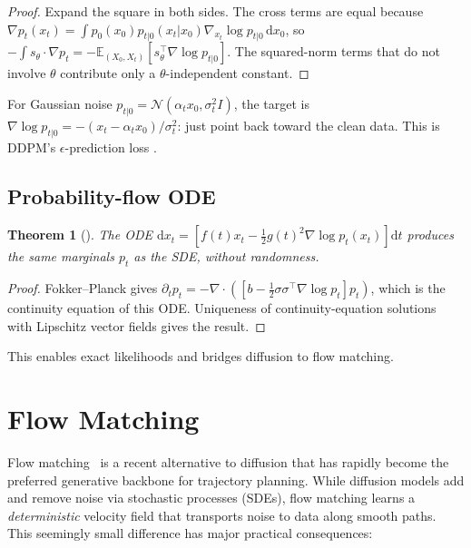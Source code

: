 \documentclass[11pt,letterpaper]{article}
\theoremstyle{plain}
\newtheorem{theorem}{Theorem}[section]
\theoremstyle{definition}
\theoremstyle{remark}
\newcommand{\E}{\mathbb{E}}
\newcommand{\dd}{\mathrm{d}}
\newcommand{\calN}{\mathcal{N}}
\newcommand{\grad}{\nabla}
\newcommand{\divg}{\nabla\cdot}
\begin{document}
\begin{advancedmath}
\begin{proof}
Expand the square in both sides. The cross terms are equal because
$\grad p_t(x_t)=\int p_0(x_0)p_{t|0}(x_t|x_0)\grad_{x_t}\log p_{t|0}\,\dd x_0$,
so $-\int s_\theta\cdot\grad p_t=-\E_{(X_0,X_t)}[s_\theta^\top\grad\log p_{t|0}]$.
The squared-norm terms that do not involve $\theta$ contribute only a
$\theta$-independent constant.
\end{proof}

For Gaussian noise $p_{t|0}=\calN(\alpha_tx_0,\sigma_t^2I)$, the target
is $\grad\log p_{t|0}=-(x_t-\alpha_tx_0)/\sigma_t^2$: just point back
toward the clean data. This is DDPM's $\epsilon$-prediction loss
\citep{ho2020ddpm}.

\subsection{Probability-flow ODE}

\begin{theorem}[\citet{song2021score}]
The ODE $\dd x_t=[f(t)x_t-\frac{1}{2}g(t)^2\grad\log p_t(x_t)]\dd t$
produces the same marginals $p_t$ as the SDE, without randomness.
\end{theorem}

\begin{proof}
Fokker--Planck gives
$\partial_tp_t=-\divg([b-\tfrac12\sigma\sigma^\top\grad\log p_t]p_t)$,
which is the continuity equation of this ODE. Uniqueness of
continuity-equation solutions with Lipschitz vector fields gives the
result.
\end{proof}

This enables exact likelihoods and bridges diffusion to flow matching.
\end{advancedmath}

\section{Flow Matching}\label{sec:fm}

Flow matching~\citep{lipman2023flow} is a recent alternative to
diffusion that has rapidly become the preferred generative backbone
for trajectory planning.  While diffusion models add and remove noise
via stochastic processes (SDEs), flow matching learns a
\emph{deterministic} velocity field that transports noise to data
along smooth paths.  This seemingly small difference has major
practical consequences:
\end{document}
